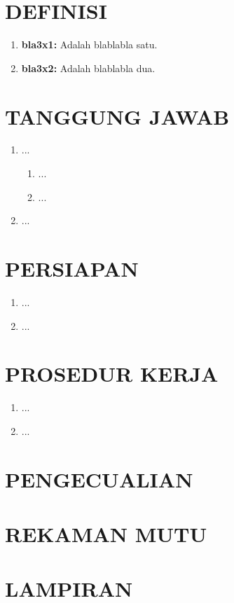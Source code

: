 \documentclass[12pt]{soi_v2}
\begin{document}
    \section{DEFINISI}
    \begin{enumerate}
        \item \textbf{bla3x1:} Adalah blablabla satu.
        \item \textbf{bla3x2:} Adalah blablabla dua.
    \end{enumerate}

    \section{TANGGUNG JAWAB}
    \begin{enumerate}
        \item ...
            \begin{enumerate}
                \item ...
                \item ...
            \end{enumerate}
        \item ...
    \end{enumerate}

    \section{PERSIAPAN}
    \begin{enumerate}
        \item ...
        \item ...
    \end{enumerate}

    \section{PROSEDUR KERJA}
    \begin{enumerate}
        \item ...
        \item ...
    \end{enumerate}

    \section{PENGECUALIAN}
    \section{REKAMAN MUTU}
    \section{LAMPIRAN}
\end{document}

